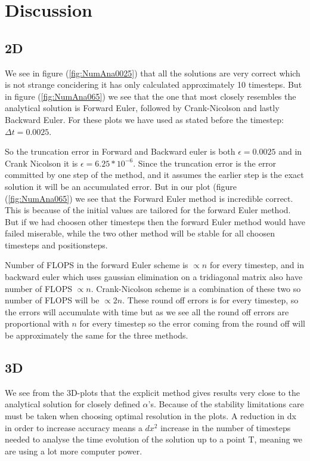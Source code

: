 \documentclass[a4paper,10pt]{article}
\begin{document}
\section{Discussion}
\subsection{2D}
We see in figure (\ref{fig:NumAna0025}) that all the solutions are very correct which is not strange concidering it has only calculated approximately 10 timesteps.
But in figure (\ref{fig:NumAna065}) we see that the one that most closely resembles the analytical solution is Forward Euler, followed by Crank-Nicolson and lastly Backward Euler. 
For these plots we have used as stated before the timestep: $\Delta t = 0.0025$.

So the truncation error in Forward and Backward euler is both $\epsilon = 0.0025$ and in Crank Nicolson it is $\epsilon = 6.25*10^{-6}$. 
Since the truncation error is the error committed by one step of the method, and it assumes the earlier step is the exact solution it will be an accumulated error.
But in our plot (figure (\ref{fig:NumAna065}) we see that the Forward Euler method is incredible correct. This is because of the initial values are 
tailored for the forward Euler method. But if we had choosen other timesteps then the forward Euler method would have failed miserable, while the
two other method will be stable for all choosen timesteps and positionsteps. 

Number of FLOPS in the forward Euler scheme is $\propto n$ for every timestep, and in backward euler which uses gaussian elimination on a tridiagonal matrix also have number of FLOPS
$\propto n$. Crank-Nicolson scheme is a combination of these two so number of FLOPS will be $\propto 2n$. These round off errors is for every timestep, so the
errors will accumulate with time but as we see all the round off errors are proportional with $n$ for every timestep so the error coming from the round
off will be approximately the same for the three methods.

\subsection{3D}
We see from the 3D-plots that the explicit method gives results very close to the analytical solution for closely defined $\alpha$'s. Because of the stability limitations care must be taken when choosing optimal resolution in the plots.
A reduction in dx in order to increase accuracy means a $dx^2$ increase in the number of timesteps needed to analyse the time evolution of the solution up to a point T, meaning we are using a lot more computer power. 
\end{document}
